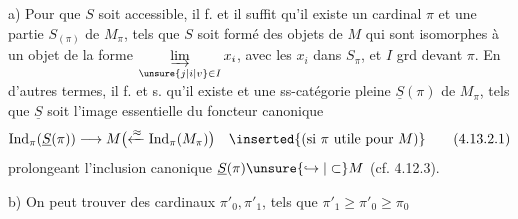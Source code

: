 a) Pour que $S$ soit accessible, il f. et il
suffit qu'il existe un cardinal  $\pi$ et une partie
$S_{(\pi)}$ de $M_\pi$,  tels que
$S$ soit formé des objets de $M$ qui
sont isomorphes à un objet de la
forme $\underset{\unsure{j|i|v}\in I}{\underrightarrow{\lim}}\,x_i$, avec les $x_i$ dans $S_\pi$,
et $I$ grd devant $\pi$. En d'autres
termes, il f. et s. qu'il existe  et une  ss-catégorie
pleine $\underline S(\pi)$ de $M_\pi$, tels que
$\underline S$ soit l'image essentielle du
foncteur canonique  
\[
 \mathrm{Ind}_\pi(\underline S(\pi))\longrightarrow M
 \bigl(\xleftarrow{\approx}\mathrm{Ind}_\pi(M_\pi)\bigr)
 \quad\inserted{\text{(si }\pi\text{ utile pour }M\text{)}}\tag*{(4.13.2.1)}
\]
prolongeant l'inclusion canonique
$\underline S(\pi)\unsure{\hookrightarrow|\subset} M$ (cf. 4.12.3).

b)  On peut trouver des cardinaux
$\pi'_0,\pi'_1$, tels que $\pi'_1\geq\pi'_0\geq\pi_0$

